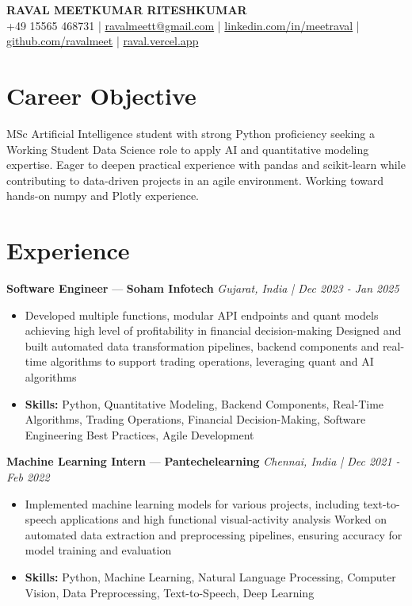 \documentclass[a4paper,10pt]{article}
\begin{document}
\begin{center}
  {\Large\bfseries RAVAL MEETKUMAR RITESHKUMAR}\\[2pt]
  {\small +49 15565 468731 \;|\; \href{mailto:ravalmeett@gmail.com}{ravalmeett@gmail.com} \;|\; \href{https://www.linkedin.com/in/meetraval/}{linkedin.com/in/meetraval} \;|\; \href{https://github.com/ravalmeet}{github.com/ravalmeet} \;|\; \href{https://raval.vercel.app/}{raval.vercel.app}}
\end{center}
\vspace{-3pt}

\section*{Career Objective}
MSc Artificial Intelligence student with strong Python proficiency seeking a Working Student Data Science role to apply AI and quantitative modeling expertise. Eager to deepen practical experience with pandas and scikit-learn while contributing to data-driven projects in an agile environment. Working toward hands-on numpy and Plotly experience.\par

\section*{Experience}
\textbf{Software Engineer} — \textbf{Soham Infotech} \hfill \textit{Gujarat, India \;|\; Dec 2023 - Jan 2025}\par
\vspace{1pt}
\begin{itemize}
  \item Developed multiple functions, modular API endpoints and quant models achieving high level of profitability in financial decision-making Designed and built automated data transformation pipelines, backend components and real-time algorithms to support trading operations, leveraging quant and AI algorithms
  \item \textbf{Skills:} Python, Quantitative Modeling, Backend Components, Real-Time Algorithms, Trading Operations, Financial Decision-Making, Software Engineering Best Practices, Agile Development
\end{itemize}
\vspace{3pt}
\textbf{Machine Learning Intern} — \textbf{Pantechelearning} \hfill \textit{Chennai, India \;|\; Dec 2021 - Feb 2022}\par
\vspace{1pt}
\begin{itemize}
  \item Implemented machine learning models for various projects, including text-to-speech applications and high functional visual-activity analysis Worked on automated data extraction and preprocessing pipelines, ensuring accuracy for model training and evaluation
  \item \textbf{Skills:} Python, Machine Learning, Natural Language Processing, Computer Vision, Data Preprocessing, Text-to-Speech, Deep Learning
\end{itemize}
\end{document}
